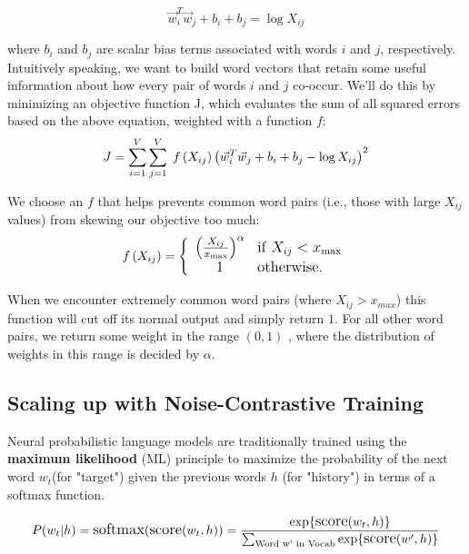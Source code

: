  \begin{equation}
     \vec{w}_i^T \vec{w}_j + b_i + b_j = \log X_{ij}
 \end{equation}
 
where $b_i$ and $b_j$ are scalar bias terms associated with words $i$ and $j$, respectively. Intuitively speaking, we want to build word vectors that retain some useful information about how every pair of words $i$ and $j$ co-occur.
We’ll do this by minimizing an objective function J, which evaluates the sum of all squared errors based on the above equation, weighted with a function $f$:
\begin{equation}
\large
J = \sum_{i=1}^V \sum_{j=1}^V \; f\left(X_{ij}\right) \left( \vec{w}_i^T \vec{w}_j + b_i + b_j - \log X_{ij} \right)^2 
\end{equation}

We choose an $f$ that helps prevents common word pairs (i.e., those with large $X_{ij}$ values) from skewing our objective too much:
 \begin{equation}
     \large
      f\left(X_{ij}\right) = \left\{ \begin{array}{cl}\left(\frac{X_{ij}}{x_{\text{max}}}\right)^\alpha 
      & \text{if } X_{ij} < x_{\text{max}} \\ 1 & \text{otherwise.} \end{array}\right. \end{equation}
      
When we encounter extremely common word pairs (where $X_{ij}>{x_{max}}$) this function will cut off its normal output and simply return $1$. For all other word pairs, we return some weight in the range $(0,1)$ , where the distribution of weights in this range is decided by $\alpha$.
 
 
 
 
\subsection{Scaling up with Noise-Contrastive Training}
     Neural probabilistic language models are traditionally trained using the \textbf{maximum likelihood} (ML) principle to maximize the probability of the next word ${w_t}$(for "target") given the previous words ${h}$  (for "history") in terms of a softmax function\cite{web003}\@.

 \begin{equation}
       \large
          P(w_t | h) = \text{softmax} (\text{score} (w_t, h)) \\
                     = \frac{\exp \{ \text{score} (w_t, h) \} }
                     {\sum_\text{Word w' in Vocab} \exp \{ \text{score} (w', h) \} }
 \end{equation}
 
